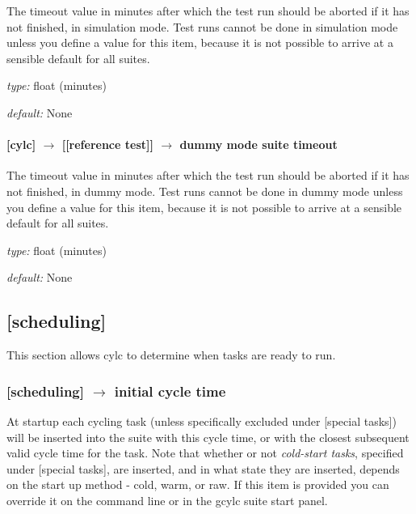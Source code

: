 The timeout value in minutes after which the test run should be aborted
if it has not finished, in simulation mode. Test runs cannot be done in
simulation mode unless you define a value for this item, because it is
not possible to arrive at a sensible default for all suites.

\begin{myitemize}
    \item {\em type:} float (minutes)
    \item {\em default:} None
\end{myitemize}

\paragraph[dummy mode suite timeout]{[cylc] $\rightarrow$ [[reference test]] $\rightarrow$ dummy mode suite timeout}

The timeout value in minutes after which the test run should be aborted
if it has not finished, in dummy mode.  Test runs cannot be done in
dummy mode unless you define a value for this item, because it is not
possible to arrive at a sensible default for all suites.

\begin{myitemize}
    \item {\em type:} float (minutes)
    \item {\em default:} None
\end{myitemize}


\subsection{[scheduling]}

This section allows cylc to determine when tasks are ready to run.

\subsubsection[initial cycle time]{[scheduling] $\rightarrow$ initial cycle time}

At startup each cycling task (unless specifically excluded under
[special tasks]) will be inserted into the suite with this cycle time,
or with the closest subsequent valid cycle time for the task. Note that
whether or not {\em cold-start tasks}, specified under [special tasks],
are inserted, and in what state they are inserted, depends on the start
up method - cold, warm, or raw.  If this item is provided you can 
override it on the command line or in the gcylc suite start panel.

